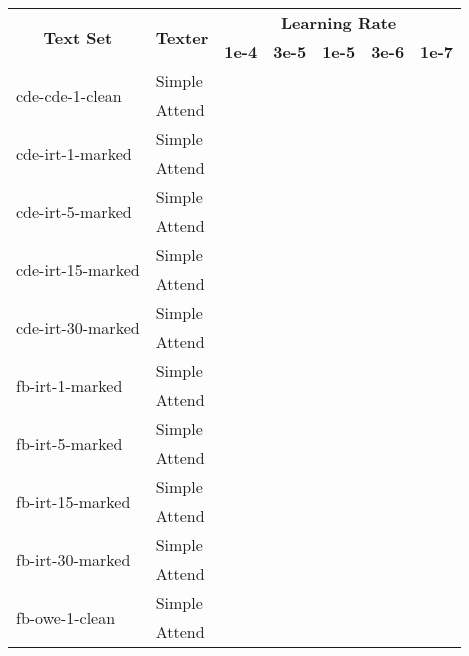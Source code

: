 \begin{tabular}{| l | l | r | r | r | r | r |}
    \hline

    \multicolumn{1}{|c|}{\multirow{2}{*}{\textbf{Text Set}}} &
    \multicolumn{1}{|c|}{\multirow{2}{*}{\textbf{Texter}}} &
    \multicolumn{5}{|c|}{\textbf{Learning Rate}} \\

    &
    &
    \multicolumn{1}{|c|}{\textbf{1e-4}} &
    \multicolumn{1}{|c|}{\textbf{3e-5}} &
    \multicolumn{1}{|c|}{\textbf{1e-5}} &
    \multicolumn{1}{|c|}{\textbf{3e-6}} &
    \multicolumn{1}{|c|}{\textbf{1e-7}} \\

    \hline \hline

    \multirow{2}{*}{cde-cde-1-clean}
    & Simple &  &  &  &  \\
    & Attend &  &  &  &  \\ \hline

    \multirow{2}{*}{cde-irt-1-marked}
    & Simple &  &  &  &  \\
    & Attend &  &  &  &  \\ \hline

    \multirow{2}{*}{cde-irt-5-marked}
    & Simple &  &  &  &  \\
    & Attend &  &  &  &  \\ \hline

    \multirow{2}{*}{cde-irt-15-marked}
    & Simple &  &  &  &  \\
    & Attend &  &  &  &  \\ \hline

    \multirow{2}{*}{cde-irt-30-marked}
    & Simple &  &  &  &  \\
    & Attend &  &  &  &  \\ \hline \hline

    \multirow{2}{*}{fb-irt-1-marked}
    & Simple &  &  &  &  \\
    & Attend &  &  &  &  \\ \hline

    \multirow{2}{*}{fb-irt-5-marked}
    & Simple &  &  &  &  \\
    & Attend &  &  &  &  \\ \hline

    \multirow{2}{*}{fb-irt-15-marked}
    & Simple &  &  &  &  \\
    & Attend &  &  &  &  \\ \hline

    \multirow{2}{*}{fb-irt-30-marked}
    & Simple &  &  &  &  \\
    & Attend &  &  &  &  \\ \hline

    \multirow{2}{*}{fb-owe-1-clean}
    & Simple &  &  &  &  \\
    & Attend &  &  &  &  \\ \hline

\end{tabular}
